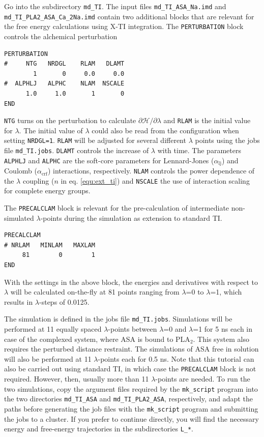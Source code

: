 Go into the subdirectory \texttt{md\_TI}. The input files \texttt{md\_TI\_ASA\_Na.imd} and \texttt{md\_TI\_PLA2\_ASA\_Ca\_2Na.imd} contain two additional blocks that are relevant for the free energy calculations using X-TI integration. The \texttt{PERTURBATION} block controls the alchemical perturbation 
\begin{lstlisting}
PERTURBATION
#     NTG   NRDGL    RLAM   DLAMT 
        1       0     0.0     0.0 
#  ALPHLJ   ALPHC    NLAM  NSCALE 
      1.0     1.0       1       0 
END
\end{lstlisting}
\texttt{NTG} turns on the perturbation to calculate $\partial\mathcal{H}/\partial\lambda$ and \texttt{RLAM} is the initial value for $\lambda$. The initial value of $\lambda$ could also be read from the configuration when setting \texttt{NRDGL=1}. \texttt{RLAM} will be adjusted for several different $\lambda$ points using the jobs file \texttt{md\_TI.jobs}. \texttt{DLAMT} controls the increase of $\lambda$ with time. The parameters \texttt{ALPHLJ} and \texttt{ALPHC} are the soft-core parameters for Lennard-Jones ($\alpha_{\text{lj}}$) and Coulomb ($\alpha_{\text{crf}}$) interactions, respectively. \texttt{NLAM} controls the power dependence of the $\lambda$ coupling ($n$ in eq. \ref{equ:ext_ti}) and \texttt{NSCALE} the use of interaction scaling for complete energy groups.  

The \texttt{PRECALCLAM} block is relevant for the pre-calculation of intermediate non-simulated $\lambda$-points during the simulation as extension to standard TI. 
\begin{lstlisting}
PRECALCLAM
# NRLAM   MINLAM   MAXLAM
     81        0        1
END
\end{lstlisting}
With the settings in the above block, the energies and derivatives with respect to $\lambda$ will be calculated on-the-fly at 81 points ranging from $\lambda$=0 to $\lambda$=1, which results in $\lambda$-steps of 0.0125.


The simulation is defined in the jobs file \texttt{md\_TI.jobs}. Simulations will be performed at 11 equally spaced $\lambda$-points between $\lambda$=0 and $\lambda$=1 for 5 ns each in case of the complexed system, where ASA is bound to PLA$_2$. This system also requires the perturbed distance restraint. The simulations of ASA free in solution will also be performed at 11 $\lambda$-points each for 0.5 ns.   
Note that this tutorial can also be carried out using standard TI, in which case the \texttt{PRECALCLAM} block is not required. However, then, usually more than 11 $\lambda$-points are needed.
To run the two simulations, copy the argument files required by the \texttt{mk\_script} program into the two directories \texttt{md\_TI\_ASA} and \texttt{md\_TI\_PLA2\_ASA}, respectively, and adapt the paths before generating the job files with the \texttt{mk\_script} program and submitting the jobs to a cluster. If you prefer to continue directly, you will find the necessary energy and free-energy trajectories in the subdirectories \texttt{L\_*}.

